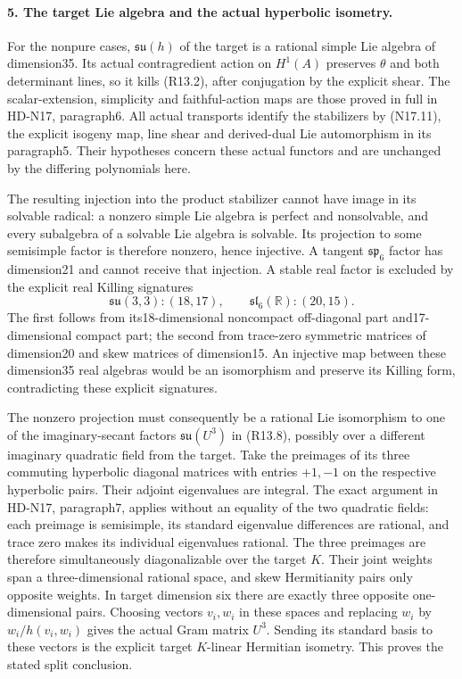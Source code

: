 \paragraph{5. The target Lie algebra and the actual hyperbolic isometry.}
For the nonpure cases, \(\mathfrak{su}(h)\) of the target
is a rational simple Lie algebra of dimension35. Its actual
contragredient action on \(H^1(A)\) preserves \(\theta\)
and both determinant lines, so it kills (R13.2), after
conjugation by the explicit shear. The scalar-extension,
simplicity and faithful-action maps are those proved in full
in HD-N17, paragraph6. All actual transports identify the
stabilizers by (N17.11), the explicit isogeny map, line
shear and derived-dual Lie automorphism in its paragraph5.
Their hypotheses concern these actual functors and are unchanged
by the differing polynomials here.

The resulting injection into the product stabilizer cannot have
image in its solvable radical: a nonzero simple Lie algebra
is perfect and nonsolvable, and every subalgebra of a solvable
Lie algebra is solvable. Its projection to some semisimple
factor is therefore nonzero, hence injective. A tangent
\(\mathfrak{sp}_6\) factor has dimension21 and cannot receive
that injection. A stable real factor is excluded by the
explicit real Killing signatures
\[
 \mathfrak{su}(3,3):(18,17),\qquad
 \mathfrak{sl}_6(\mathbb R):(20,15).                       \tag{R13.13}
\]
The first follows from its18-dimensional noncompact off-diagonal
part and17-dimensional compact part; the second from trace-zero
symmetric matrices of dimension20 and skew matrices of dimension15.
An injective map between these dimension35 real algebras would
be an isomorphism and preserve its Killing form, contradicting
these explicit signatures.

The nonzero projection must consequently be a rational Lie
isomorphism to one of the imaginary-secant factors
\(\mathfrak{su}(U^3)\) in (R13.8), possibly over a different
imaginary quadratic field from the target. Take the preimages
of its three commuting hyperbolic diagonal matrices with entries
\(+1,-1\) on the respective hyperbolic pairs. Their adjoint
eigenvalues are integral. The exact argument in HD-N17,
paragraph7, applies without an equality of the two quadratic
fields: each preimage is semisimple, its standard eigenvalue
differences are rational, and trace zero makes its individual
eigenvalues rational. The three preimages are therefore
simultaneously diagonalizable over the target \(K\).
Their joint weights span a three-dimensional rational space,
and skew Hermitianity pairs only opposite weights. In target
dimension six there are exactly three opposite one-dimensional
pairs. Choosing vectors \(v_i,w_i\) in these spaces and
replacing \(w_i\) by \(w_i/h(v_i,w_i)\) gives the
actual Gram matrix \(U^3\). Sending its standard basis to
these vectors is the explicit target \(K\)-linear Hermitian
isometry. This proves the stated split conclusion.

